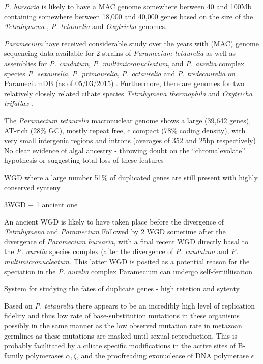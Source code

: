 \textit{P. bursaria} is likely to have a MAC genome somewhere between 40 and 100Mb containing somewhere between 
18,000 and 40,000 genes based on the size of the \textit{Tetrahymena} \citep{Eisen2006}, \textit{P. tetaurelia} \citep{Aury2006} and
\textit{Oxytricha} \citep{Swart2013} genomes.











\textit{Paramecium} have received considerable study over the years with (MAC) genome sequencing data
available for 2 strains of \textit{Paramecium tetaurelia} \citep{Aury2006} as well as assemblies for 
\textit{P. caudatum}, \textit{P. multimicronucleatum}, and \textit{P. aurelia} complex species \textit{P. sexaurelia},
\textit{P. primaurelia}, \textit{P. octaurelia} and \textit{P. tredecaurelia} on ParameciumDB (as of 05/03/2015) \citep{Arnaiz2011}.
Furthermore, there are genomes for two relatively closely related ciliate species 
\textit{Tetrahymena thermophila} \citep{Eisen2006} and \textit{Oxytricha trifallax} \citep{Swart2013}.



The \textit{Paramecium tetaurelia} macronuclear genome shows a large (39,642 genes), AT-rich (28\% GC),
mostly repeat free, c
compact (78\% coding density), 
with very small intergenic regions and introns (averages of 352 and 25bp respectively)
No clear evidence of algal ancestry - throwing doubt on the ``chromalevolate'' hypothesis or suggesting total loss
of these features 

WGD  where a large number 51\% of duplicated genes are still present with highly conserved synteny

3WGD  + 1 ancient one

An ancient WGD is likely to have taken place before the divergence of \textit{Tetrahymena} and \textit{Paramecium}
Followed by 2 WGD sometime after the divergence of \textit{Paramecium bursaria}, with a final recent WGD
directly basal to the \textit{P. aurelia} species complex (after the divergence of \textit{P. caudatum} and \textit{P. multimicronucleatum}.
This latter WGD is posited as a potential reason for the speciation in the \textit{P. aurelia} complex 
Paramecium can undergo self-fertiiliisaiton

System for studying the fates of duplicate genes  - high retetion and sytenty 
\citep{Aury2006}

Based on \textit{P. tetaurelia} there appears to be an incredibly high level of replication fidelity and thus low rate of 
base-substitution mutations in these organisms possibly in the same manner as the low observed mutation rate in metazoan germlines
as these mutations are masked until sexual reproduction.  This is probably facilitated by a ciliate specific modifications in the
active sites of B-family polymerases \(\alpha, \zeta\), and the proofreading exonuclease of DNA polymerase \(\epsilon\) \citep{Sung2012}




